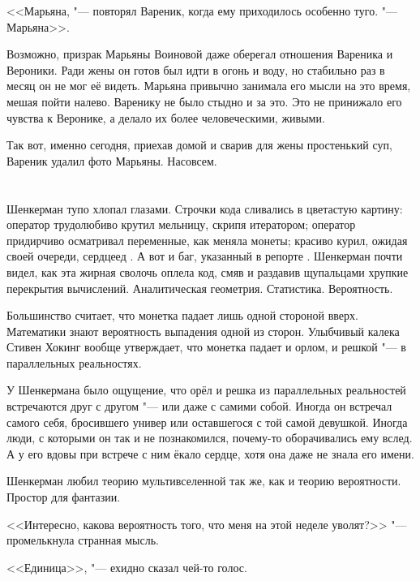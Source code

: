 <<Марьяна, "--- повторял Вареник, когда ему приходилось особенно туго.
"--- Марьяна>>.

Возможно, призрак Марьяны Воиновой даже оберегал отношения Вареника и Вероники.
Ради жены он готов был идти в огонь и воду, но стабильно раз в месяц он не мог её видеть.
Марьяна привычно занимала его мысли на это время, мешая пойти налево.
Варенику не было стыдно и за это.
Это не принижало его чувства к Веронике, а делало их более человеческими, живыми.

Так вот, именно сегодня, приехав домой и сварив для жены простенький суп, Вареник удалил фото Марьяны.
Насовсем.

\chapter{}

\textspace

\label{Sat_2012_07_07}

Шенкерман тупо хлопал глазами.
Строчки кода сливались в цветастую картину: оператор  трудолюбиво крутил мельницу, скрипя итератором;
оператор  придирчиво осматривал переменные, как меняла монеты;
красиво курил, ожидая своей очереди, сердцеед .
А вот и баг, указанный в репорте .
Шенкерман почти видел, как эта жирная сволочь оплела код, смяв и раздавив щупальцами хрупкие перекрытия вычислений.
Аналитическая геометрия.
Статистика.
Вероятность.

Большинство считает, что монетка падает лишь одной стороной вверх.
Математики знают вероятность выпадения одной из сторон.
Улыбчивый калека Стивен Хокинг вообще утверждает, что монетка падает и орлом, и решкой "--- в параллельных реальностях.

У Шенкермана было ощущение, что орёл и решка из параллельных реальностей встречаются друг с другом "--- или даже с самими собой.
Иногда он встречал самого себя, бросившего универ или оставшегося с той самой девушкой.
Иногда люди, с которыми он так и не познакомился, почему-то оборачивались ему вслед.
А у его вдовы при встрече с ним ёкало сердце, хотя она даже не знала его имени.

Шенкерман любил теорию мультивселенной так же, как и теорию вероятности.
Простор для фантазии.

<<Интересно, какова вероятность того, что меня на этой неделе уволят?>> "--- промелькнула странная мысль.

<<Единица>>, "--- ехидно сказал чей-то голос.

